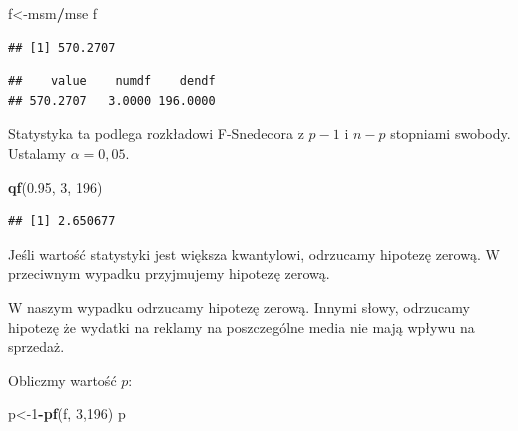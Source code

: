 \documentclass[]{article}
\newenvironment{Shaded}{\begin{snugshade}}{\end{snugshade}}
\newcommand{\KeywordTok}[1]{\textcolor[rgb]{0.13,0.29,0.53}{\textbf{#1}}}
\newcommand{\DecValTok}[1]{\textcolor[rgb]{0.00,0.00,0.81}{#1}}
\newcommand{\FloatTok}[1]{\textcolor[rgb]{0.00,0.00,0.81}{#1}}
\newcommand{\OperatorTok}[1]{\textcolor[rgb]{0.81,0.36,0.00}{\textbf{#1}}}
\newcommand{\NormalTok}[1]{#1}
\begin{document}
\begin{Shaded}
\begin{Highlighting}[]
\NormalTok{f<-msm}\OperatorTok{/}\NormalTok{mse}
\NormalTok{f}
\end{Highlighting}
\end{Shaded}

\begin{verbatim}
## [1] 570.2707
\end{verbatim}

\begin{Shaded}
\end{Shaded}

\begin{verbatim}
##    value    numdf    dendf 
## 570.2707   3.0000 196.0000
\end{verbatim}

Statystyka ta podlega rozkładowi F-Snedecora z \(p-1\) i \(n-p\)
stopniami swobody. Ustalamy \(\alpha=0,05\).

\begin{Shaded}
\begin{Highlighting}[]
\KeywordTok{qf}\NormalTok{(}\FloatTok{0.95}\NormalTok{, }\DecValTok{3}\NormalTok{, }\DecValTok{196}\NormalTok{)}
\end{Highlighting}
\end{Shaded}

\begin{verbatim}
## [1] 2.650677
\end{verbatim}

Jeśli wartość statystyki jest większa kwantylowi, odrzucamy hipotezę
zerową. W przeciwnym wypadku przyjmujemy hipotezę zerową.

W naszym wypadku odrzucamy hipotezę zerową. Innymi słowy, odrzucamy
hipotezę że wydatki na reklamy na poszczególne media nie mają wpływu na
sprzedaż.

Obliczmy wartość \(p\):

\begin{Shaded}
\begin{Highlighting}[]
\NormalTok{p<-}\DecValTok{1}\OperatorTok{-}\KeywordTok{pf}\NormalTok{(f, }\DecValTok{3}\NormalTok{,}\DecValTok{196}\NormalTok{)}
\NormalTok{p}
\end{Highlighting}
\end{Shaded}
\end{document}
